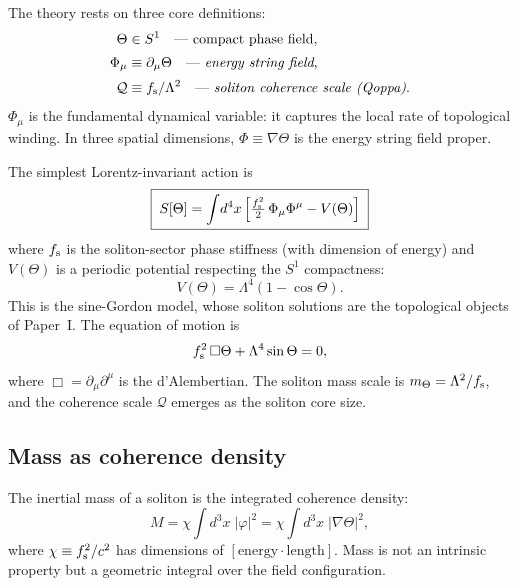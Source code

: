 \documentclass[a4paper,12pt]{article}
\newcommand{\Qoppa}{\mathcal{Q}} %
\newcommand{\qoppa}{\Qoppa} %
\newcommand{\Phifield}{\Phi} %
\newcommand{\fsol}{f_{\rm s}}
\begin{document}
The theory rests on three core definitions:
\begin{align}
 \Theta &\in S^1
 \quad\text{--- compact phase field,}
 \label{eq:Theta}\\[2pt]
 \Phifield_\mu &\equiv \partial_\mu\Theta
 \quad\text{--- \emph{energy string field},}
 \label{eq:Phidef}\\[2pt]
 \Qoppa &\equiv \fsol/\Lambda^2
 \quad\text{--- \emph{soliton coherence scale (Qoppa)}.}
 \label{eq:qoppadef}
\end{align}
$\Phifield_\mu$ is the fundamental dynamical variable: it captures
the local rate of topological winding. In three spatial dimensions,
$\Phifield \equiv \nabla\Theta$ is the energy string field proper.

The simplest Lorentz-invariant action is
\begin{equation}
\label{eq:action}
 \boxed{\;S[\Theta] = \int\! d^4x \left[
 \tfrac{\fsol^2}{2}\,\Phifield_\mu\Phifield^\mu
 - V(\Theta)\right]\;}
\end{equation}
where $\fsol$ is the soliton-sector phase stiffness (with dimension of energy) and
$V(\Theta)$ is a periodic potential respecting the $S^1$ compactness:
\begin{equation}
\label{eq:potential}
 V(\Theta) = \Lambda^4(1 - \cos\Theta).
\end{equation}
This is the sine-Gordon model, whose soliton solutions are the
topological objects of Paper~I\@. The equation of motion is
\begin{equation}
\label{eq:eom}
 \fsol^2\,\Box\Theta + \Lambda^4\sin\Theta = 0,
\end{equation}
where $\Box = \partial_\mu\partial^\mu$ is the d'Alembertian.
The soliton mass scale is $m_\Theta = \Lambda^2/\fsol$, and the
coherence scale $\qoppa$ emerges as the soliton core size.

\subsection{Mass as coherence density}

The inertial mass of a soliton is the integrated coherence density:
\begin{equation}
\label{eq:mass}
 M = \chi \int d^3x\;|\varphi|^2
 = \chi \int d^3x\;|\nabla\Theta|^2,
\end{equation}
where $\chi \equiv \fsol^2/c^2$ has dimensions of
$[\mathrm{energy} \cdot \mathrm{length}]$.
Mass is not an intrinsic property but a geometric integral over the
field configuration.
\end{document}
